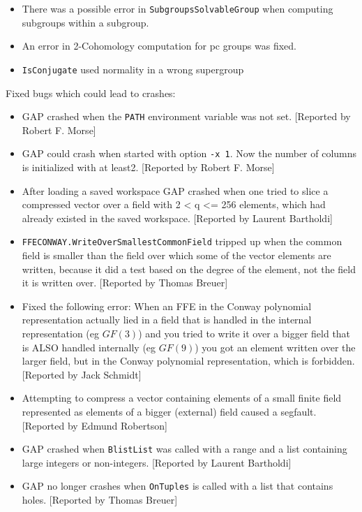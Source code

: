 \documentclass[a4paper,11pt]{report}
\begin{document}
{{\begin{itemize}
labelled as PGL(2, 49). 
\item  There was a possible error in \texttt{SubgroupsSolvableGroup} when computing subgroups within a subgroup. 
\item  An error in 2-Cohomology computation for pc groups was fixed. 
\item  \texttt{IsConjugate} used normality in a wrong supergroup 
\end{itemize}
 Fixed bugs which could lead to crashes: 
\begin{itemize}
\item  \textsf{GAP} crashed when the \texttt{PATH} environment variable was not set. [Reported by Robert F. Morse] 
\item  \textsf{GAP} could crash when started with option \texttt{-x 1}. Now the number of columns is initialized with at least{\nobreakspace}2.
[Reported by Robert F. Morse] 
\item  After loading a saved workspace \textsf{GAP} crashed when one tried to slice a compressed vector over a field with 2
{\textless} q {\textless}= 256 elements, which had already existed in the
saved workspace. [Reported by Laurent Bartholdi] 
\item  \texttt{FFECONWAY.WriteOverSmallestCommonField} tripped up when the common field is smaller than the field over which some of
the vector elements are written, because it did a test based on the degree of
the element, not the field it is written over. [Reported by Thomas Breuer] 
\item  Fixed the following error: When an FFE in the Conway polynomial representation
actually lied in a field that is handled in the internal representation (eg $GF(3)$) and you tried to write it over a bigger field that is ALSO handled
internally (eg $GF(9)$) you got an element written over the larger field, but in the Conway
polynomial representation, which is forbidden. [Reported by Jack Schmidt] 
\item  Attempting to compress a vector containing elements of a small finite field
represented as elements of a bigger (external) field caused a segfault.
[Reported by Edmund Robertson] 
\item  \textsf{GAP} crashed when \texttt{BlistList} was called with a range and a list containing large integers or non-integers.
[Reported by Laurent Bartholdi] 
\item  \textsf{GAP} no longer crashes when \texttt{OnTuples} is called with a list that contains holes. [Reported by Thomas Breuer] 
\end{itemize}
}}
\end{document}
